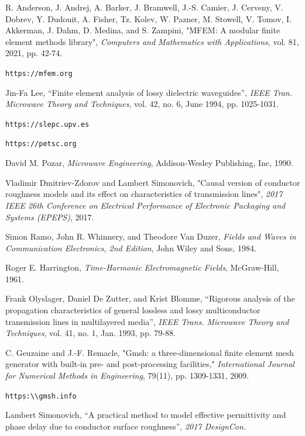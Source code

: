 \documentclass[titlepage]{article}
\renewcommand\_{\textunderscore\linebreak[1]}
\begin{document}
\begin{thebibliography}{unsrt}

 R. Anderson, J. Andrej, A. Barker, J. Bramwell, J.-S. Camier, J. Cerveny, V. Dobrev, Y. Dudouit, A. Fisher, Tz. Kolev, W. Pazner, M. Stowell, V. Tomov, I. Akkerman, J. Dahm, D. Medina, and S. Zampini, "MFEM: A modular finite element methods library", \textit{Computers and Mathematics with Applications}, vol. 81, 2021, pp. 42-74.

 \verb+https://mfem.org+

 Jin-Fa Lee, “Finite element analysis of lossy dielectric waveguides”, \textit{IEEE Tran. Microwave Theory and Techniques}, vol. 42, no. 6, June 1994, pp. 1025-1031.

 \verb+https://slepc.upv.es+

 \verb+https://petsc.org+

 David M. Pozar, \textit{Microwave Engineering}, Addison-Wesley Publishing, Inc, 1990.

 Vladimir Dmitriev-Zdorov and Lambert Simonovich, "Causal version of conductor roughness models and its effect on characteristics of transmission lines", \textit{2017 IEEE 26th Conference on Electrical Performance of Electronic Packaging and Systems (EPEPS)}, 2017.

 Simon Ramo, John R. Whinnery, and Theodore Van Duzer, \textit{Fields and Waves in Communication Electronics, 2nd Edition}, John Wiley and Sons, 1984.

 Roger E. Harrington, \textit{Time-Harmonic Electromagnetic Fields}, McGraw-Hill, 1961.

 Frank Olyslager, Daniel De Zutter, and Krist Blomme, “Rigorous analysis of the propagation characteristics of general lossless and lossy multiconductor transmission lines in multilayered media”, \textit{IEEE Trans. Microwave Theory and Techniques}, vol. 41, no. 1, Jan. 1993, pp. 79-88.

 C. Geuzaine and J.-F. Remacle, "Gmsh: a three-dimensional finite element mesh generator with built-in pre- and post-processing facilities," \textit{International Journal for Numerical Methods in Engineering}, 79(11), pp. 1309-1331, 2009.

 \verb+https:\\gmsh.info+

 Lambert Simonovich, “A practical method to model effective permittivity and phase delay due to conductor surface roughness”, \textit{2017 DesignCon}.

\end{thebibliography}
\end{document}
